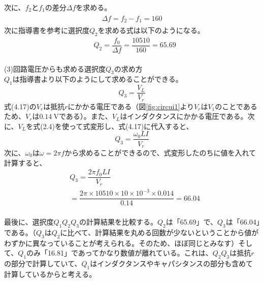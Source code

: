 \documentclass[12pt,a4paper]{jsarticle}
\numberwithin{equation}{section}
\numberwithin{figure}{section}
\numberwithin{table}{section}
\begin{document}
      次に、$f_2$と$f_1$の差分$\Delta f$を求める。
      \begin{eqnarray}
        \begin{split}
          \Delta f= f_2 - f_1 =160
        \end{split}
      \end{eqnarray}
      次に指導書を参考に選択度$Q_2$を求める式は以下のようになる。
      \begin{equation}
        \begin{split}
          &Q_2=\dfrac{f_0}{\Delta f}=\dfrac{10510}{160}=65.69
        \end{split}
      \end{equation}\\
      (3)回路電圧からも求める選択度$Q_3$の求め方\\
      $Q_1$は指導書より以下のようにして求めることができる。
      \begin{equation}
        Q_3=\dfrac{V_L}{V_r}
      \end{equation}
      式(4.17)の$V_r$は抵抗$r$にかかる電圧である（図\ref{fig:circui1}より$V_r$は$V_1$のことであるため、$V_r$は$\SI{0.14}{\volt}$である）。また、$V_L$はインダクタンスにかかる電圧である。次に、$V_L$を式(2.4)を使って式変形し、式(4.17)に代入すると、
      \begin{equation}
        Q_3=\dfrac{\omega_0 L  I}{V_r}
      \end{equation}
      次に、$\omega_0$は$\omega=2 \pi f$から求めることができるので、式変形したのちに値を入れて計算すると、
      \begin{equation}
        \begin{split}
          &Q_3=\dfrac{2 \pi f_0 L  I}{V_r}\\
          &=\dfrac{2 \pi \times 10510 \times 10 \times 10^{-3} \times 0.014}{0.14}=66.04
        \end{split}
      \end{equation}
      \\
      最後に、選択度$Q_1Q_2Q_3$の計算結果を比較する。$Q_2$は「65.69」で、$Q_3$は「66.04」である。（$Q_3$は$Q_2$に比べて、計算結果を丸める回数が少ないということから値がわずかに異なっていることが考えられる。そのため、ほぼ同じとみなす）そして、$Q_1$のみ「16.81」であってかなり数値が離れている。これは、$Q_2Q_3$は抵抗$r$の部分で計算していて、$Q_1$はインダクタンスやキャパシタンスの部分も含めて計算しているからと考える。
\end{document}
